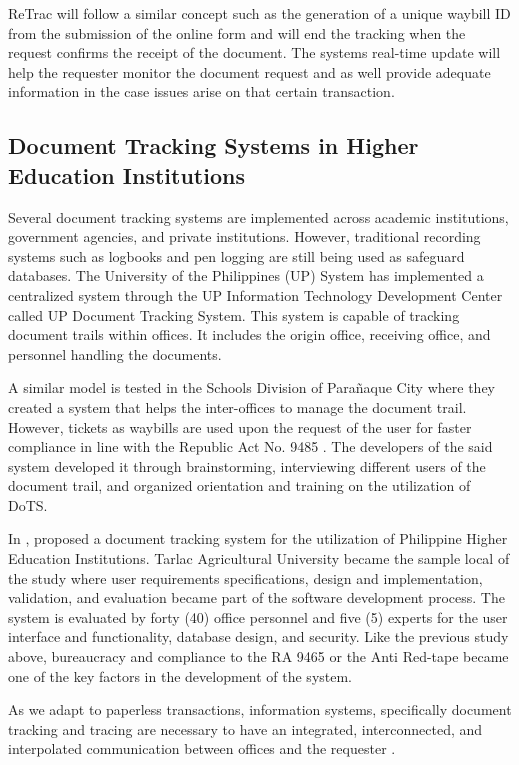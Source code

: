 ReTrac will follow a similar concept such as the generation of a unique waybill ID from the submission of the online form and will end the tracking when the request confirms the receipt of the document. The system\textsc{}s real-time update will help the requester monitor the document request and as well provide adequate information in the case issues arise on that certain transaction. 

\subsection{Document Tracking Systems in Higher Education Institutions}

Several document tracking systems are implemented across academic institutions, government agencies, and private institutions. However, traditional recording systems such as logbooks and pen logging are still being used as safeguard databases. The University of the Philippines (UP)  System has implemented a centralized system through the UP Information Technology Development Center called UP Document Tracking System.  This system is capable of tracking document trails within offices. It includes the origin office, receiving office, and personnel handling the documents. \cite{UP_DTS} 

A similar model is tested in the Schools Division of Parañaque City \cite{emralino} where they created a system that helps the inter-offices to manage the document trail. However, tickets as waybills are used upon the request of the user for faster compliance in line with the Republic Act No. 9485 \cite{ra945}. The developers of the said system developed it through brainstorming, interviewing different users of the document trail, and organized orientation and training on the utilization of DoTS. 

In , \citeauthor{dts_hei} proposed a document tracking system for the utilization of Philippine Higher Education Institutions. Tarlac Agricultural University became the sample local of the study where user requirements specifications, design and implementation, validation, and evaluation became part of the software development process. The system is evaluated by forty (40) office personnel and five (5) experts for the user interface and functionality, database design, and security. Like the previous study above, bureaucracy and compliance to the RA 9465 or the Anti Red-tape became one of the key factors in the development of the system. 

As we adapt to paperless transactions, information systems, specifically document tracking and tracing are necessary to have an integrated, interconnected, and interpolated communication between offices and the requester \cite{felipe_mendez_2020}. 

